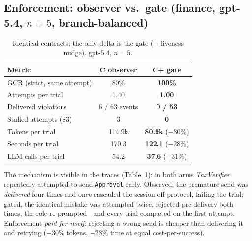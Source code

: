 \documentclass{article}
\begin{document}
\subsection{Enforcement: observer vs.\ gate (finance, gpt-5.4, $n{=}5$, branch-balanced)}
\begin{table}[t]
\centering\small
\caption{Identical contracts; the only delta is the gate ($+$ liveness nudge). gpt-5.4, $n{=}5$.}
\label{tab:gate}
\begin{tabular}{@{}lcc@{}}
\toprule
\textbf{Metric} & \textbf{C observer} & \textbf{C+ gate} \\
\midrule
GCR (strict, same attempt) & 80\% & \textbf{100\%} \\
Attempts per trial & 1.40 & \textbf{1.00} \\
Delivered violations & 6 / 63 events & \textbf{0 / 53} \\
Stalled attempts (S3) & 3 & \textbf{0} \\
Tokens per trial & 114.9k & \textbf{80.9k} ($-30\%$) \\
Seconds per trial & 170.3 & \textbf{122.1} ($-28\%$) \\
LLM calls per trial & 54.2 & \textbf{37.6} ($-31\%$) \\
\bottomrule
\end{tabular}
\end{table}
The mechanism is visible in the traces (Table~\ref{tab:gate}): in both arms \textit{TaxVerifier} repeatedly attempted to send \texttt{Approval} early. Observed, the premature send was \emph{delivered} four times and once cascaded the session off-protocol, failing the trial; gated, the identical mistake was attempted twice, rejected pre-delivery both times, the role re-prompted---and every trial completed on the first attempt. Enforcement \emph{paid for itself}: rejecting a wrong send is cheaper than delivering it and retrying ($-30\%$ tokens, $-28\%$ time at equal cost-per-success).
\end{document}
